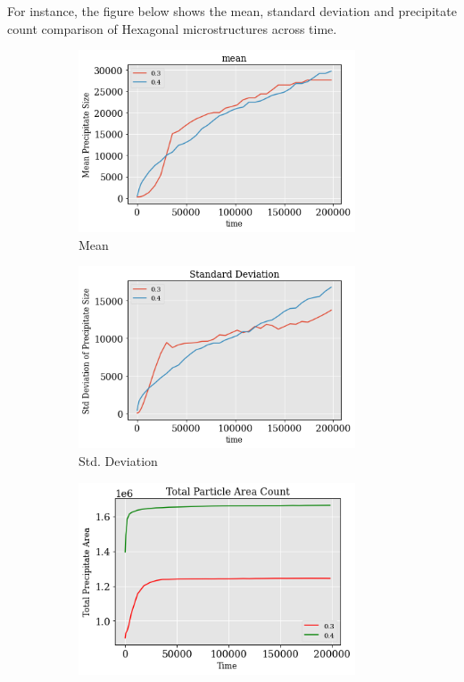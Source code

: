 \documentclass[12pt, a4paper]{report}
\begin{document}
For instance, the figure below shows the mean, standard deviation and precipitate count comparison of Hexagonal microstructures across time. 

\begin{figure}[H]
\centering
\begin{subfigure}{.45\textwidth}
  \centering
  \includegraphics[width=0.9\textwidth]{Pictures/MSFeatures/mean_size.png}
  \caption{Mean}
  \label{img:microstrImg}
\end{subfigure}
\begin{subfigure}{.45\textwidth}
  \centering
  \includegraphics[width=0.9\textwidth]{Pictures/MSFeatures/std_size.png}
  \caption{Std. Deviation}
  \label{img:microstrImg}
\end{subfigure}
\begin{subfigure}{.45\textwidth}
  \centering
  \includegraphics[width=0.9\textwidth]{Pictures/MSFeatures/total_size.png}

\end{subfigure}
\end{figure}
\end{document}

